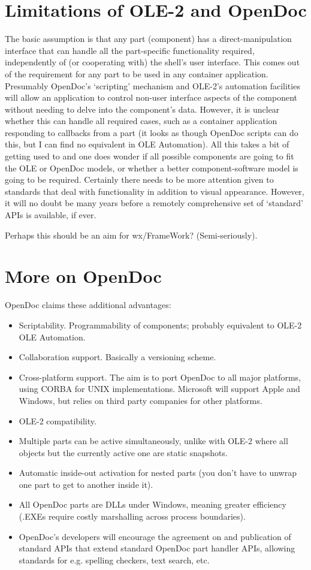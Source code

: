 \section{Limitations of OLE-2 and OpenDoc}

The basic assumption is that any part (component) has a
direct-manipulation interface that can handle all the part-specific
functionality required, independently of (or cooperating with) the
shell's user interface. This comes out of the requirement for any part
to be used in any container application. Presumably OpenDoc's
`scripting' mechanism and OLE-2's automation facilities will allow an
application to control non-user interface aspects of the component
without needing to delve into the component's data. However, it is
unclear whether this can handle all required cases, such as a container
application responding to callbacks from a part (it looks as though OpenDoc scripts can do
this, but I can find no equivalent in OLE Automation). All this takes a bit of
getting used to and one does wonder if all possible components are going
to fit the OLE or OpenDoc models, or whether a better component-software
model is going to be required. Certainly there needs to be more
attention given to standards that deal with functionality in addition
to visual appearance. However, it will no doubt be many years before a
remotely comprehensive set of `standard' APIs is available, if ever.

Perhaps this should be an aim for wx/FrameWork? (Semi-seriously).

\section{More on OpenDoc}

OpenDoc claims these additional advantages:

\begin{itemize}
\item Scriptability. Programmability of components; probably equivalent
to OLE-2 OLE Automation.
\item Collaboration support. Basically a versioning scheme.
\item Cross-platform support. The aim is to port OpenDoc to all major
platforms, using CORBA for UNIX implementations. Microsoft will support Apple and Windows, but relies on third
party companies for other platforms.
\item OLE-2 compatibility.
\item Multiple parts can be active simultaneously, unlike with OLE-2
where all objects but the currently active one are static snapshots.
\item Automatic inside-out activation for nested parts (you don't have
to unwrap one part to get to another inside it).
\item All OpenDoc parts are DLLs under Windows, meaning greater
efficiency (.EXEs require costly marshalling across process boundaries).
\item OpenDoc's developers will encourage the agreement on and
publication of standard APIs that extend standard OpenDoc part handler
APIs, allowing standards for e.g. spelling checkers, text search, etc.
\end{itemize}

